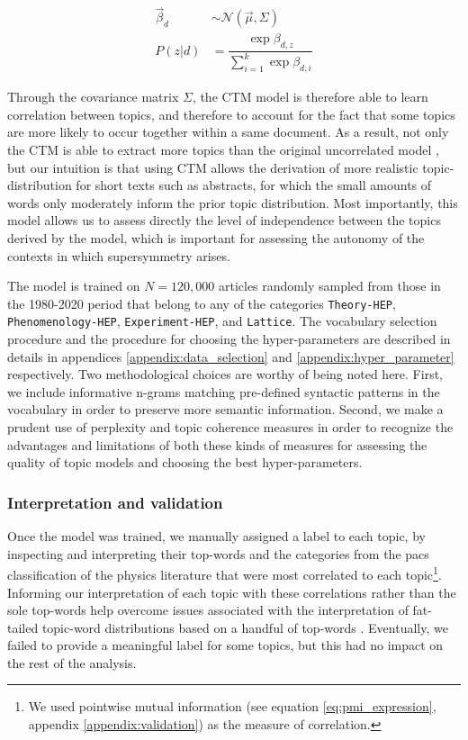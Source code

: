 \documentclass[smallextended]{svjour3}
\begin{document}
\begin{align}
    \label{eq:ctm_prior}
    \vec{\beta}_{d} &\sim \mathcal{N}(\vec{\mu}, \Sigma) \\
    P(z|d) &= \dfrac{\exp \beta_{d,z}}{\sum_{i=1}^k \exp \beta_{d,i}}
\end{align}

Through the covariance matrix $\Sigma$, the CTM model is therefore able to learn correlation between topics, and therefore to account for the fact that some topics are more likely to occur together within a same document. As a result, not only the CTM is able to extract more topics than the original uncorrelated model \citep{Blei2007}, but our intuition is that using CTM allows the derivation of more realistic topic-distribution for short texts such as abstracts, for which the small amounts of words only moderately inform the prior topic distribution. Most importantly, this model allows us to assess directly the level of independence between the topics derived by the model, which is important for assessing the autonomy of the contexts in which supersymmetry arises.

The model is trained on $N=120,000$ articles randomly sampled from those in the 1980-2020 period that belong to any of the categories \texttt{Theory-HEP}, \texttt{Phenomenology-HEP}, \texttt{Experiment-HEP}, and \texttt{Lattice}. The vocabulary selection procedure and the procedure for choosing the hyper-parameters are described in details in appendices \ref{appendix:data_selection} and \ref{appendix:hyper_parameter} respectively. Two methodological choices are worthy of being noted here. First, we include informative n-grams matching pre-defined syntactic patterns in the vocabulary in order to preserve more semantic information. Second, we make a prudent use of perplexity and topic coherence measures in order to recognize the advantages and limitations of both these kinds of measures for assessing the quality of topic models and choosing the best hyper-parameters.

\subsubsection{Interpretation and validation}

Once the model was trained, we manually assigned a label to each topic, by inspecting and interpreting their top-words and the categories from the \gls{pacs} classification of the physics literature that were most correlated to each topic\footnote{We used pointwise mutual information (see equation \ref{eq:pmi_expression}, appendix \ref{appendix:validation}) as the measure of correlation.}. Informing our interpretation of each topic with these correlations rather than the sole top-words help overcome issues associated with the interpretation of fat-tailed topic-word distributions based on a handful of top-words \citep{Chang2009,Allen2022}. Eventually, we failed to provide a meaningful label for some topics, but this had no impact on the rest of the analysis.
\end{document}
